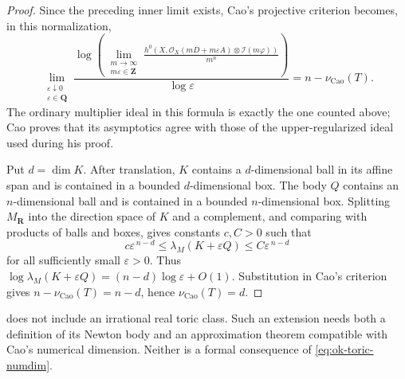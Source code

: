 \begin{proof}
Since the preceding inner limit exists, Cao's projective criterion
\cite[Proposition~4.4]{Cao14} becomes, in this normalization,
\[
 \lim_{\substack{\varepsilon\downarrow0\\
                  \varepsilon\in\mathbf Q}}
 \frac{\log\!\left(
   \displaystyle\lim_{\substack{m\to\infty\\m\varepsilon\in\mathbf Z}}
   \frac{h^0\!\left(X,\mathcal O_X(mD+m\varepsilon A)
                    \otimes\mathcal I(m\varphi)\right)}{m^n}
   \right)}{\log\varepsilon}
 =n-\nu_{\mathrm{Cao}}(T).
\]
The ordinary multiplier ideal in this formula is exactly the one counted
above; Cao proves that its asymptotics agree with those of the
upper-regularized ideal used during his proof.

Put \(d=\dim K\).
After translation, \(K\) contains a \(d\)-dimensional ball in its affine
span and is contained in a bounded \(d\)-dimensional box.  The body \(Q\)
contains an \(n\)-dimensional ball and is contained in a bounded
\(n\)-dimensional box.  Splitting \(M_{\mathbf R}\) into the direction space
of \(K\) and a complement, and comparing with products of balls and boxes,
gives constants \(c,C>0\) such that
\[
 c\varepsilon^{\,n-d}
 \leq\lambda_M(K+\varepsilon Q)
 \leq C\varepsilon^{\,n-d}
\tag{55.52}\label{eq:ok-toric-tube-growth}
\]
for all sufficiently small \(\varepsilon>0\).
Thus
\(\log\lambda_M(K+\varepsilon Q)
 =(n-d)\log\varepsilon+O(1)\).  Substitution in Cao's criterion gives
\(n-\nu_{\mathrm{Cao}}(T)=n-d\), hence
\(\nu_{\mathrm{Cao}}(T)=d\).
\end{proof}

\begin{remark}
\label{rem:ok-toric-scope}
 does not include an irrational real toric
class.
Such an extension needs both a definition of its Newton body and an
approximation theorem compatible with Cao's numerical dimension.
Neither is a formal consequence of \eqref{eq:ok-toric-numdim}.
\end{remark}
